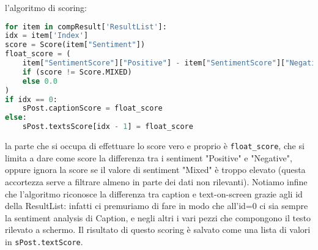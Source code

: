 l'algoritmo di scoring:
\begin{lstlisting}[language=Python]
for item in compResult['ResultList']:
idx = item['Index']
score = Score(item["Sentiment"])
float_score = (
    item["SentimentScore"]["Positive"] - item["SentimentScore"]["Negative"]
    if (score != Score.MIXED)
    else 0.0
)
if idx == 0:
    sPost.captionScore = float_score
else:
    sPost.textsScore[idx - 1] = float_score
\end{lstlisting}
la parte che si occupa di effettuare lo score vero e proprio è \verb+float_score+, che si limita
a dare come score la differenza tra i sentiment "Positive" e "Negative", oppure ignora la score se 
il valore di sentiment "Mixed" è troppo elevato (questa accortezza serve a filtrare almeno in parte
dei dati non rilevanti).
Notiamo infine che l'algoritmo riconosce la differenza tra caption e text-on-screen grazie agli id
della ResultList: infatti ci premuriamo di fare in modo che all'id=0 ci sia sempre la sentiment 
analysis di Caption, e negli altri i vari pezzi che compongono il testo rilevato a schermo.
Il risultato di questo scoring è salvato come una lista di valori in \verb+sPost.textScore+.
